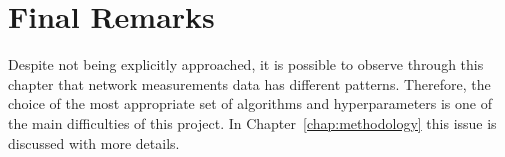 \section{Final Remarks}

Despite not being explicitly approached, it is possible to observe
through this chapter
that network measurements data has different patterns. Therefore,
the choice of the most appropriate set of algorithms and hyperparameters
is one of the main difficulties of this project.
In Chapter~\ref{chap:methodology} this issue is discussed with more details.
